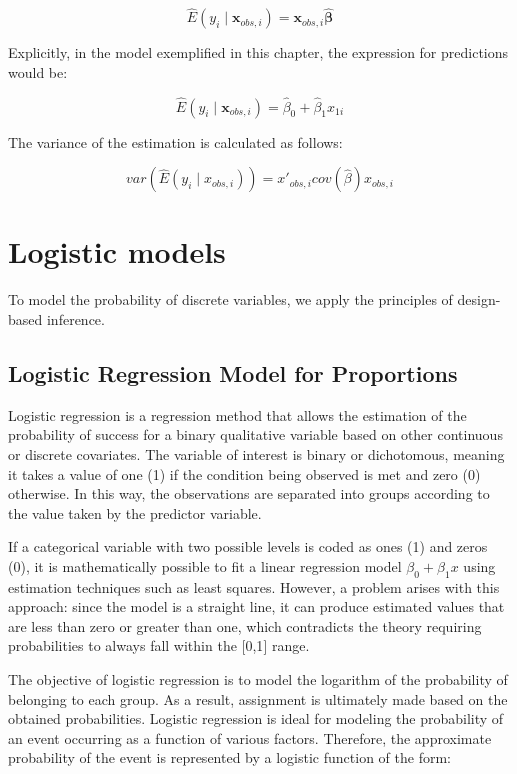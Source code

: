 \documentclass[
  12pt,
]{book}
\begin{document}
\[
\hat{E}(y_{i}\mid\boldsymbol{x}_{obs,i})=\boldsymbol{x}_{obs,i}\hat{\boldsymbol{\beta}}
\]

Explicitly, in the model exemplified in this chapter, the expression for predictions would be:

\[
\hat{E}(y_{i}\mid\boldsymbol{x}_{obs,i})=\hat{\beta}_{0}+\hat{\beta}_{1}x_{1i}
\]

The variance of the estimation is calculated as follows:

\[
var\left(\hat{E}\left(y_{i}\mid x_{obs,i}\right)\right) 
=  x'_{obs,i}cov\left(\hat{\beta}\right)x{}_{obs,i}
\]

\hypertarget{logistic-models}{%
\section{Logistic models}\label{logistic-models}}

To model the probability of discrete variables, we apply the principles of design-based inference.

\hypertarget{logistic-regression-model-for-proportions}{%
\subsection{Logistic Regression Model for Proportions}\label{logistic-regression-model-for-proportions}}

Logistic regression is a regression method that allows the estimation of the probability of success for a binary qualitative variable based on other continuous or discrete covariates. The variable of interest is binary or dichotomous, meaning it takes a value of one (1) if the condition being observed is met and zero (0) otherwise. In this way, the observations are separated into groups according to the value taken by the predictor variable.

If a categorical variable with two possible levels is coded as ones (1) and zeros (0), it is mathematically possible to fit a linear regression model \(\beta_0 + \beta_1 x\) using estimation techniques such as least squares. However, a problem arises with this approach: since the model is a straight line, it can produce estimated values that are less than zero or greater than one, which contradicts the theory requiring probabilities to always fall within the {[}0,1{]} range.

The objective of logistic regression is to model the logarithm of the probability of belonging to each group. As a result, assignment is ultimately made based on the obtained probabilities. Logistic regression is ideal for modeling the probability of an event occurring as a function of various factors. Therefore, the approximate probability of the event is represented by a logistic function of the form:
\end{document}
